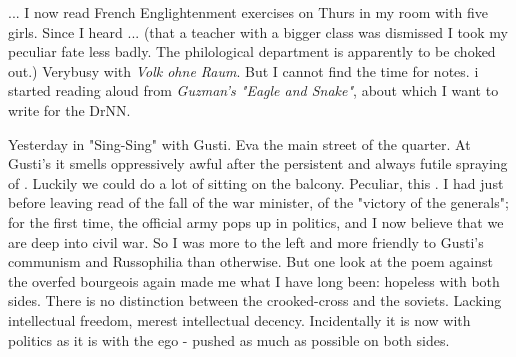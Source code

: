... I now read French Englightenment exercises on Thurs in my room with five girls. Since I heard ... (that a teacher with a bigger class was dismissed I took my peculiar fate less badly. The philological department is apparently to be choked out.) Verybusy with \textit{Volk ohne Raum}. But I cannot find the time for notes. 
i started reading aloud from \textit{Guzman's "Eagle and Snake"}, about which I want to write for the DrNN.

\missing Yesterday in "Sing-Sing" with Gusti. Eva  the main street of the quarter. At Gusti's it smells oppressively awful after the persistent and always futile spraying of . Luckily we could do a lot of sitting on the balcony. Peculiar, this .
I had just before leaving read of the fall of the war minister, of the "victory of the generals"; for the first time, the official army pops up in politics, and I now believe that we are deep into civil war. So I was more to the left and more friendly to Gusti's communism and Russophilia than otherwise. But one look at the poem against the overfed bourgeois again made me what I have long been: hopeless with both sides. There is no distinction between the crooked-cross and the soviets. Lacking intellectual freedom, merest intellectual decency. 
Incidentally it is now with politics as it is with the ego - pushed as much as possible on both sides.

\missing
